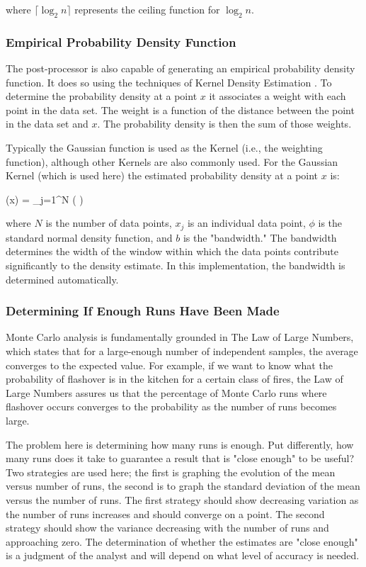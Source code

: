 \documentclass[12pt,twoside]{book}
\begin{document}
where  $\lceil \log_2 n \rceil$ represents the ceiling function for $ \log_2 n$.

\subsubsection{Empirical Probability Density Function}

The post-processor is also capable of generating an empirical probability density function. It does so using the techniques of Kernel Density Estimation \cite{Haste_2009}. To determine the probability density at a point $x$ it associates a weight with each point in the data set. The weight is a function of the distance between the point in the data set and $x$. The probability density is then the sum of those weights.

Typically the Gaussian function is used as the Kernel (i.e., the weighting function), although other Kernels are also commonly used. For the Gaussian Kernel (which is used here) the estimated probability density at a point $x$ is:

\be
(x) = \sum_{j=1}^{N} \phi\left( \right)
\ee

where $N$ is the number of data points, $x_j$ is an individual data point, $\phi$ is the standard normal density function, and $b$ is the "bandwidth." The bandwidth determines the width of the window within which the data points contribute significantly to the density estimate. In this implementation, the bandwidth is determined automatically.

\subsubsection{Determining If Enough Runs Have Been Made}

Monte Carlo analysis is fundamentally grounded in The Law of Large Numbers, which states that for a large-enough number of independent samples, the average converges to the expected value. For example, if we want to know what the probability of flashover is in the kitchen for a certain class of fires, the Law of Large Numbers assures us that the percentage of Monte Carlo runs where flashover occurs converges to the probability as the number of runs becomes large.

The problem here is determining how many runs is enough. Put differently, how many runs does it take to guarantee a result that is "close enough" to be useful? Two strategies are used here; the first is graphing the evolution of the mean versus number of runs, the second is to graph the standard deviation of the mean versus the number of runs. The first strategy should show decreasing variation as the number of runs increases and should converge on a point. The second strategy should show the variance decreasing with the number of runs and approaching zero. The determination of whether the estimates are "close enough" is a judgment of the analyst and will depend on what level of accuracy is needed.
\end{document}
